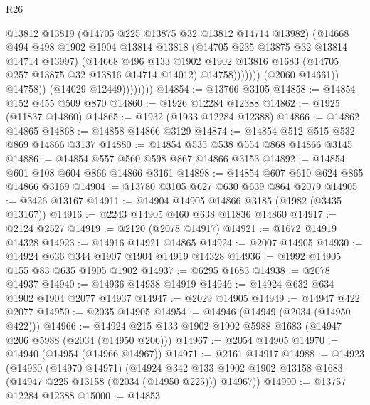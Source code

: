 \begin{lexlean}{R26}
\begin{coremodule}
                                  @13812
                                  @13819
                                  (@14705 @225 @13875 @32 @13812 @14714 @13982)
                                  (@14668
                                    @494
                                    @498
                                    @1902
                                    @1904
                                    @13814
                                    @13818
                                    (@14705 @235 @13875 @32 @13814 @14714 @13997)
                                    (@14668
                                      @496
                                      @133
                                      @1902
                                      @1902
                                      @13816
                                      @1683
                                      (@14705 @257 @13875 @32 @13816 @14714 @14012)
                                      @14758)))))))
                        (@2060 @14661))
                      @14758))
                  (@14029 @12449))))))))
@14854 := @13766 @3105
@14858 := @14854 @152 @455 @509 @870
@14860 := @1926 @12284 @12388
@14862 := @1925 (@11837 @14860)
@14865 := @1932 (@1933 @12284 @12388)
@14866 := @14862 @14865
@14868 := @14858 @14866 @3129
@14874 := @14854 @512 @515 @532 @869 @14866 @3137
@14880 := @14854 @535 @538 @554 @868 @14866 @3145
@14886 := @14854 @557 @560 @598 @867 @14866 @3153
@14892 := @14854 @601 @108 @604 @866 @14866 @3161
@14898 := @14854 @607 @610 @624 @865 @14866 @3169
@14904 := @13780 @3105 @627 @630 @639 @864 @2079
@14905 := @3426 @13167
@14911 := @14904 @14905 @14866 @3185 (@1982 (@3435 @13167))
@14916 := @2243 @14905 @460 @638 @11836 @14860
@14917 := @2124 @2527
@14919 := @2120 (@2078 @14917)
@14921 := @1672 @14919 @14328
@14923 := @14916 @14921 @14865
@14924 := @2007 @14905
@14930 := @14924 @636 @344 @1907 @1904 @14919 @14328
@14936 := @1992 @14905 @155 @83 @635 @1905 @1902
@14937 := @6295 @1683
@14938 := @2078 @14937
@14940 := @14936 @14938 @14919
@14946 := @14924 @632 @634 @1902 @1904 @2077 @14937
@14947 := @2029 @14905
@14949 := @14947 @422 @2077
@14950 := @2035 @14905
@14954 := @14946 (@14949 (@2034 (@14950 @422)))
@14966 := @14924 @215 @133 @1902 @1902 @5988 @1683 (@14947 @206 @5988 (@2034 (@14950 @206)))
@14967 := @2054 @14905
@14970 := @14940 (@14954 (@14966 @14967))
@14971 := @2161 @14917
@14988 := @14923
    (@14930
      (@14970 @14971)
      (@14924 @342 @133 @1902 @1902 @13158 @1683 (@14947 @225 @13158 (@2034 (@14950 @225))) @14967))
@14990 := @13757 @12284 @12388
@15000 := @14853

\end{coremodule}
\end{lexlean}
